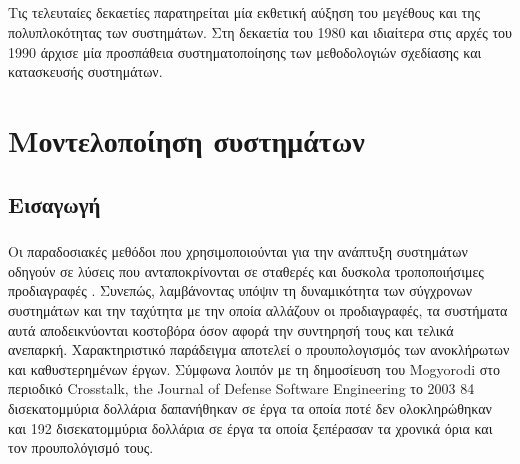 \documentclass[a4paper,12pt,twoside]{report}
\begin{document}
			\paragraph{} {Τις τελευταίες δεκαετίες παρατηρείται μία εκθετική αύξηση του μεγέθους και της πολυπλοκότητας των συστημάτων.  Στη δεκαετία του 1980 και ιδιαίτερα στις αρχές του 1990 άρχισε μία προσπάθεια συστηματοποίησης των μεθοδολογιών σχεδίασης και κατασκευσής συστημάτων. \cite{FoundationalConceptsMDSD}
			}
							
	\chapter{Μοντελοποίηση συστημάτων}
		\label{κεφ.:Μοντελοποίηση συστημάτων}

		\section{Εισαγωγή}
			\paragraph{} {Οι παραδοσιακές μεθόδοι που χρησιμοποιούνται για την ανάπτυξη συστημάτων οδηγούν σε λύσεις που ανταποκρίνονται σε σταθερές και δυσκολα τροποποιήσιμες προδιαγραφές . Συνεπώς, λαμβάνοντας υπόψιν τη δυναμικότητα των σύγχρονων συστημάτων και την ταχύτητα με την οποία αλλάζουν οι προδιαγραφές, τα συστήματα αυτά αποδεικνύονται κοστοβόρα όσον αφορά την συντηρησή τους και τελικά ανεπαρκή. Χαρακτηριστικό παράδειγμα αποτελεί ο προυπολογισμός των ανοκλήρωτων και καθυστερημένων έργων. Σύμφωνα λοιπόν με τη δημοσίευση του Mogyorodi στο περιοδικό Crosstalk, the Journal of Defense Software Engineering το 2003 \cite{JournalDefenseMogyorodi} 84 δισεκατομμύρια δολλάρια δαπανήθηκαν σε έργα τα οποία ποτέ δεν ολοκληρώθηκαν και 192 δισεκατομμύρια δολλάρια σε έργα τα οποία ξεπέρασαν τα χρονικά όρια και τον προυπολόγισμό τους.
			}
\end{document}

